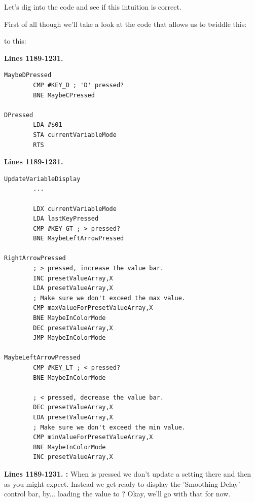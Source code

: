 Let's dig into the code and see if this intuition is correct.

First of all though we'll take a look at the code that allows us to
twiddle this:

    \begin{adjustbox}{width=9cm}
    \end{adjustbox}

to this:

    \begin{adjustbox}{width=8.2cm}
    \end{adjustbox}

\clearpage

\textbf{Lines 1189-1231. }
\begin{lstlisting}[caption=From \icode{CheckKeyboardInput}.]
MaybeDPressed   
        CMP #KEY_D ; 'D' pressed?
        BNE MaybeCPressed

DPressed
        LDA #$01
        STA currentVariableMode
        RTS 
\end{lstlisting}
\textbf{Lines 1189-1231. }
\begin{lstlisting}[caption=From \icode{CheckKeyboardInputForActiveVariable}.]
UpdateVariableDisplay   
        ...

        LDX currentVariableMode
        LDA lastKeyPressed
        CMP #KEY_GT ; > pressed?
        BNE MaybeLeftArrowPressed

RightArrowPressed
        ; > pressed, increase the value bar.
        INC presetValueArray,X
        LDA presetValueArray,X
        ; Make sure we don't exceed the max value.
        CMP maxValueForPresetValueArray,X
        BNE MaybeInColorMode
        DEC presetValueArray,X
        JMP MaybeInColorMode

MaybeLeftArrowPressed   
        CMP #KEY_LT ; < pressed?
        BNE MaybeInColorMode

        ; < pressed, decrease the value bar.
        DEC presetValueArray,X
        LDA presetValueArray,X
        ; Make sure we don't exceed the min value.
        CMP minValueForPresetValueArray,X
        BNE MaybeInColorMode
        INC presetValueArray,X

\end{lstlisting}
\clearpage
\textbf{Lines 1189-1231. :} When  is pressed we don't
update a setting there and then as you might expect. Instead we get ready to display the 'Smoothing
Delay' control bar, by... loading the value  to ? Okay, we'll
go with that for now.

